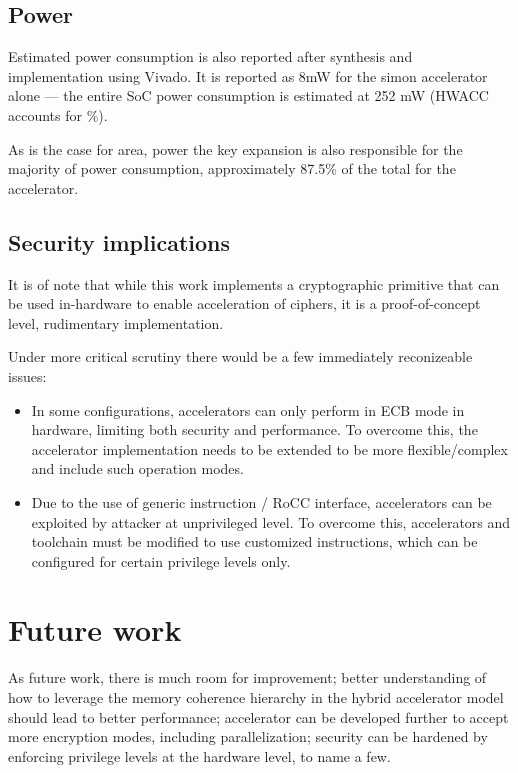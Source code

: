 \documentclass[10pt,conference]{IEEEtran}
\begin{document}
\subsection{Power}

Estimated power consumption is also reported after synthesis and implementation
using Vivado. It is reported as 8mW for the simon accelerator alone --- the
entire SoC power consumption is estimated at 252 mW (HWACC accounts for \%).

As is the case for area, power the key expansion is also responsible for the
majority of power consumption, approximately 87.5\% of the total for the accelerator.

\subsection{Security implications}

It is of note that while this work implements a cryptographic primitive that can
be used in-hardware to enable acceleration of ciphers, it is a proof-of-concept
level, rudimentary implementation.

Under more critical scrutiny there would be a few immediately reconizeable
issues:

\begin{itemize}
  \item In some configurations, accelerators can only perform in ECB mode in
    hardware, limiting both security and performance. To overcome this, the
    accelerator implementation needs to be extended to be more flexible/complex
    and include such operation modes.
  \item Due to the use of generic instruction / RoCC interface, accelerators
    can be exploited by attacker at unprivileged level. To overcome this,
    accelerators and toolchain must be modified to use customized instructions,
    which can be configured for certain privilege levels only.
\end{itemize}

\section{Future work}

As future work, there is much room for improvement; better understanding of how
to leverage the memory coherence hierarchy in the hybrid accelerator model
should lead to better performance; accelerator can be developed further to
accept more encryption modes, including parallelization; security can be
hardened by enforcing privilege levels at the hardware level, to name a few.
\end{document}
